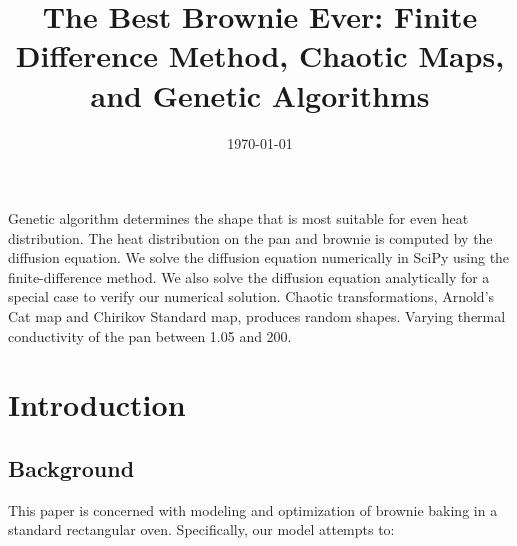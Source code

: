 \documentclass[12pt]{reedmcm}
\title{\textbf{The Best Brownie Ever: Finite Difference Method, Chaotic Maps, and Genetic Algorithms}}
\date{\today}
\begin{document}

\begin{summary}
  Genetic algorithm determines the shape that is most suitable for even heat distribution.
  The heat distribution on the pan and brownie is computed by the diffusion equation.
  We solve the diffusion equation numerically in SciPy using the finite-difference method.
  We also solve the diffusion equation analytically for a special case to verify our numerical solution.
  Chaotic transformations, Arnold's Cat map and Chirikov Standard map, produces random shapes.
  Varying thermal conductivity of the pan between 1.05 and 200.

  \end{summary}

\maketitle
\tableofcontents
\listoffigures

\section{Introduction}
\subsection{Background}
This paper is concerned with modeling and optimization of brownie baking in a standard rectangular oven. Specifically, our model attempts to:
\end{document}
